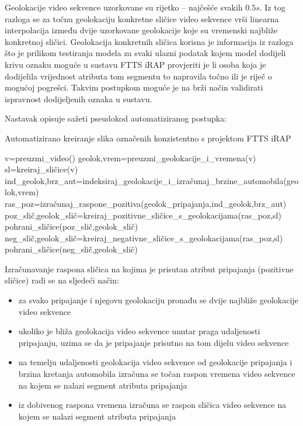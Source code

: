 \documentclass[times, utf8, diplomski, numeric]{fer}
\begin{document}
Geolokacije video sekvence uzorkovane su rijetko -- najčešće svakih $0.5s$. 
Iz tog razloga se za točnu geolokaciju konkretne sličice video sekvence vrši linearna interpolacija između dvije uzorkovane geolokacije koje su vremenski najbliže konkretnoj sličici.
Geolokacija konkretnih sličica korisna je informacija iz razloga što je prilikom testiranja modela za svaki ulazni podatak kojem model dodijeli krivu oznaku moguće u sustavu FTTS iRAP provjeriti je li osoba koja je dodijelila vrijednost atributa tom segmentu to napravila točno ili je riječ o mogućoj pogrešci. 
Takvim postupkom moguće je na brži način validirati ispravnost dodijeljenih oznaka u sustavu.

Nastavak opisuje sažeti pseudokod automatiziranog postupka:
\begin{algorithm}[H]
\caption{Automatizirano kreiranje slika označenih konzistentno s projektom FTTS iRAP}
\label{alg:dataset_creator}
\begin{algorithmic}
\STATE v=preuzmi\_video()
\STATE geolok,vrem=preuzmi\_geolokacije\_i\_vremena(v)
\STATE sl=kreiraj\_sličice(v)
\STATE ind\_geolok,brz\_aut=indeksiraj\_geolokacije\_i\_izračunaj\_brzine\_automobila(geolok,vrem)
\STATE ras\_poz=izračunaj\_raspone\_pozitiva(geolok\_pripajanja,ind\_geolok,brz\_aut)
\STATE poz\_slič,geolok\_slič=kreiraj\_pozitivne\_sličice\_s\_geolokacijama(ras\_poz,sl)
\STATE pohrani\_sličice(poz\_slič,geolok\_slič)
\STATE neg\_slič,geolok\_slič=kreiraj\_negativne\_sličice\_s\_geolokacijama(ras\_poz,sl)
\STATE pohrani\_sličice(neg\_slič,geolok\_slič)
\ENDWHILE
\end{algorithmic}
\end{algorithm}

\noindent Izračunavanje raspona sličica na kojima je prisutan atribut pripajanja (pozitivne sličice) radi se na sljedeći način:
\begin{itemize}
 \item za svako pripajanje i njegovu geolokaciju pronađu se dvije najbliže geolokacije video sekvence
 \item ukoliko je bliža geolokacija video sekvence unutar praga udaljenosti pripajanju, uzima se da je pripajanje prisutno na tom dijelu video sekvence
 \item na temelju udaljenosti geolokacija video sekvence od geolokacije pripajanja i brzina kretanja automobila izračuna se točan raspon vremena video sekvence na kojem se nalazi segment atributa pripajanja
 \item iz dobivenog raspona vremena izračuna se raspon sličica video sekvence na kojem se nalazi segment atributa pripajanja
\end{itemize}
\end{document}
